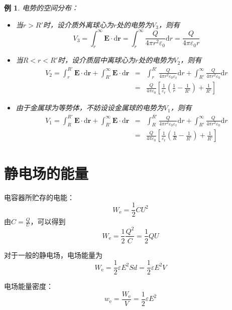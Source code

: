 \documentclass[12pt, a4paper, twoside]{ctexbook}
\newtheorem{example}[theorem]{例}
\begin{document}
\begin{example}
    {\sonti 电势的空间分布}：
    \begin{itemize}
        \item 当$r>R'$时，设介质外离球心为$r$处的电势为$V_3$，则有
        $$
        V_3=\int_{r}^{\infty}\boldsymbol{E}\cdot\mathrm{d}\boldsymbol{r}=\int_{r}^{\infty}\frac{Q}{4\pi r^2\varepsilon _0}\mathrm{d}r=\frac{Q}{4\pi\varepsilon_0r}
        $$
        \item 当$R<r<R'$时，设介质层中离球心为$r$处的电势为$V_2$，则有
        \begin{eqnarray}
            V_2=\int_{r}^{R'}\boldsymbol{E}\cdot\mathrm{d}\boldsymbol{r}+\int_{R'}^{\infty}\boldsymbol{E}\cdot\mathrm{d}\boldsymbol{r} &=& \int_{r}^{R'}\frac{Q}{4\pi r^2\varepsilon _0\varepsilon _{\mathrm{r}}}\mathrm{d}r+\int_{R'}^{\infty}\frac{Q}{4\pi r^2\varepsilon _0}\mathrm{d}r \nonumber \\
            ~&=& \frac{Q}{4\pi\varepsilon_0}\left[\frac{1}{\varepsilon_{\mathrm{r}}}\left(\frac{1}{r}-\frac{1}{R'}\right)+\frac{1}{R'}\right] \nonumber
        \end{eqnarray}
        \item 由于金属球为等势体，不妨设设金属球的电势为$V_1$，则有
        \begin{eqnarray}
            V_1=\int_{R}^{R'}\boldsymbol{E}\cdot\mathrm{d}\boldsymbol{r}+\int_{R'}^{\infty}\boldsymbol{E}\cdot\mathrm{d}\boldsymbol{r} &=& \int_{R}^{R'}\frac{Q}{4\pi r^2\varepsilon _0\varepsilon _{\mathrm{r}}}\mathrm{d}r+\int_{R'}^{\infty}\frac{Q}{4\pi r^2\varepsilon _0}\mathrm{d}r \nonumber \\
            ~&=& \frac{Q}{4\pi\varepsilon_0}\left[\frac{1}{\varepsilon_{\mathrm{r}}}\left(\frac{1}{R}-\frac{1}{R'}\right)+\frac{1}{R'}\right] \nonumber
        \end{eqnarray}
    \end{itemize}
\end{example}
\section{静电场的能量}
{\sonti 电容器所贮存的电能}：
$$
W_\mathrm{e}=\frac{1}{2}CU^2
$$
由$C=\frac{Q}{U}$，可以得到
$$
W_\mathrm{e}=\frac{1}{2}\frac{Q^2}{C}=\frac{1}{2}QU
$$

对于一般的静电场，电场能量为
$$
W_\mathrm{e}=\frac{1}{2}\varepsilon E^2 Sd=\frac{1}{2}\varepsilon E^2 V
$$

{\sonti 电场能量密度}：
$$
w_\mathrm{e}=\frac{W_\mathrm{e}}{V}=\frac{1}{2}\varepsilon E^2
$$
\end{document}
